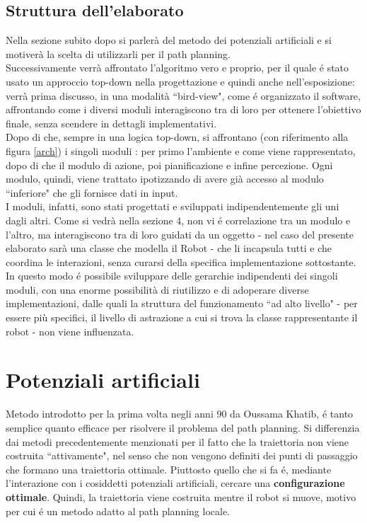 \documentclass[14pt,a4paper]{extarticle}
\begin{document}
\subsection{Struttura dell'elaborato} 
Nella sezione subito dopo si parlerà del metodo dei potenziali artificiali e si motiverà la scelta di utilizzarli per il path planning.\\
Successivamente verrà affrontato l'algoritmo vero e proprio, per il quale é stato usato un approccio top-down nella progettazione e quindi anche nell'esposizione: verrà prima discusso, in una modalità ``bird-view", come é organizzato il software, affrontando come i diversi moduli interagiscono tra di loro per ottenere l'obiettivo finale, senza scendere in dettagli implementativi.\\
Dopo di che, sempre in una logica top-down, si affrontano (con riferimento alla figura \ref{arch}) i singoli moduli : per primo l'ambiente e come viene rappresentato, dopo di che il modulo di azione, poi pianificazione e infine percezione. Ogni modulo, quindi, viene trattato ipotizzando di avere già accesso al modulo ``inferiore" che gli fornisce dati in input. \\
I moduli, infatti, sono stati progettati e sviluppati indipendentemente gli uni dagli altri. Come si vedrà nella sezione 4, non vi é correlazione tra un modulo e l'altro, ma interagiscono tra di loro guidati da un oggetto - nel caso del presente elaborato sarà una classe che modella il Robot - che li incapsula tutti e che coordina le interazioni, senza curarsi della specifica implementazione sottostante. In questo modo é possibile sviluppare delle gerarchie indipendenti dei singoli moduli, con una enorme possibilità di riutilizzo e di adoperare diverse implementazioni, dalle quali la struttura del funzionamento ``ad alto livello" - per essere più specifici, il livello di astrazione a cui si trova la classe rappresentante il robot - non viene influenzata.

\newpage
\section{Potenziali artificiali}

Metodo introdotto per la prima volta negli anni 90 da Oussama Khatib, é tanto semplice quanto efficace per risolvere il problema del path planning. Si differenzia dai metodi precedentemente menzionati per il fatto che la traiettoria non viene costruita ``attivamente", nel senso che non vengono definiti dei punti di passaggio che formano una traiettoria ottimale. Piuttosto quello che si fa é, mediante l'interazione con i cosiddetti potenziali artificiali, cercare una \textbf{configurazione ottimale}. Quindi, la traiettoria viene costruita mentre il robot si muove, motivo per cui é un metodo adatto al path planning locale.
\end{document}
